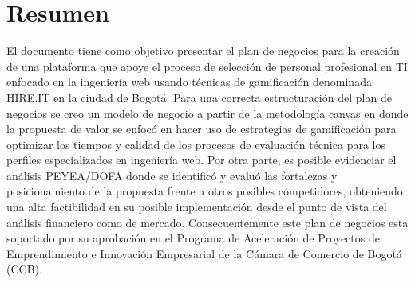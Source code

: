 \section*{Resumen}
\noindent 




El documento tiene como objetivo presentar el plan de negocios para la creación de una plataforma que apoye el proceso de selección de personal profesional en TI enfocado en la ingeniería web usando técnicas de gamificación denominada HIRE.IT en la ciudad de Bogotá. Para una correcta estructuración del plan de negocios se creo un modelo de negocio a partir de la metodología canvas en donde la propuesta de valor se enfocó en hacer uso de estrategias de gamificación para optimizar los tiempos y calidad de los procesos de evaluación  técnica para los perfiles especializados en ingeniería web. Por otra parte, es posible evidenciar el análisis PEYEA/DOFA donde se identificó y evaluó las fortalezas y posicionamiento de la propuesta frente a otros posibles competidores, obteniendo una alta factibilidad en su posible implementación desde el punto de vista del análisis financiero como de mercado. Consecuentemente este plan de negocios esta soportado por su aprobación en el  Programa de Aceleración de Proyectos de Emprendimiento e Innovación Empresarial de la Cámara de Comercio de Bogotá (CCB).